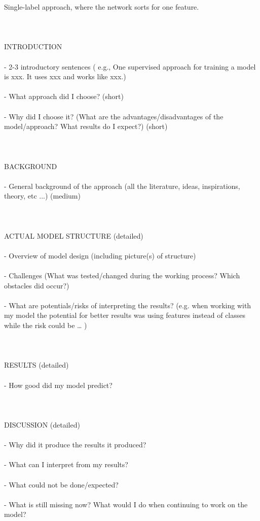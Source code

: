 Single-label approach, where the network sorts for one feature. \\
\\
\\
\\
INTRODUCTION \\
\\
- 2-3 introductory sentences ( e.g., One supervised approach for training a model is xxx. It uses xxx and works like xxx.) \\
\\
- What approach did I choose? (short) \\
\\
- Why did I choose it? (What are the advantages/disadvantages of the model/approach? What results do I expect?) (short) \\
\\
\\
\\
BACKGROUND \\
\\
- General background of the approach (all the literature, ideas, inspirations, theory, etc ...) (medium) \\
\\
\\
\\
ACTUAL MODEL STRUCTURE (detailed) \\
\\
- Overview of model design (including picture(s) of structure) \\
\\
- Challenges (What was tested/changed during the working process? Which obstacles did occur?) \\
\\
- What are potentials/risks of interpreting the results? (e.g. when working with my model the potential for better results was using features instead of classes while the risk could be … ) \\
\\
\\
\\
RESULTS (detailed) \\
\\
- How good did my model predict? \\
\\
\\
\\
DISCUSSION (detailed) \\
\\
- Why did it produce the results it produced? \\
\\
- What can I interpret from my results? \\
\\
- What could not be done/expected? \\
\\
- What is still missing now? What would I do when continuing to work on the model? \\
\\

